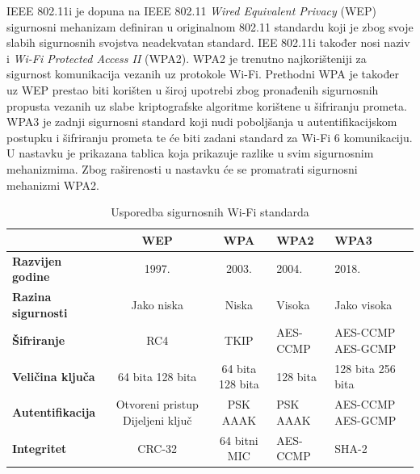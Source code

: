 \documentclass[times, utf8, diplomski]{fer}
\begin{document}
IEEE 802.11i je dopuna na IEEE 802.11 \emph{Wired Equivalent Privacy} (WEP) sigurnosni mehanizam definiran u originalnom 802.11 standardu koji je zbog svoje slabih sigurnosnih svojstva neadekvatan standard. IEE 802.11i također nosi naziv i \emph{Wi-Fi Protected Access II} (WPA2). WPA2 je trenutno najkorišteniji za sigurnost komunikacija vezanih uz protokole Wi-Fi. Prethodni WPA je također uz WEP prestao biti korišten u široj upotrebi zbog pronađenih sigurnosnih propusta vezanih uz slabe kriptografske algoritme korištene u šifriranju prometa. WPA3 je zadnji sigurnosni standard koji nudi poboljšanja u autentifikacijskom postupku i šifriranju prometa te će biti zadani standard za Wi-Fi 6 komunikaciju. U nastavku je prikazana tablica koja prikazuje razlike u svim sigurnosnim mehanizmima. Zbog raširenosti u nastavku će se promatrati sigurnosni mehanizmi WPA2.
\begin{table}[H]
    \centering
    \caption{Usporedba sigurnosnih Wi-Fi standarda}
    \begin{tabular}{| M || S | S | X | X |} 
    \hline
                              & \textbf{WEP} & \textbf{WPA} & \textbf{WPA2} & \textbf{WPA3}\\
    \hline\hline
    \textbf{Razvijen godine}         & 1997. & 2003. & 2004. & 2018.\\
    \hline
    \textbf{Razina sigurnosti}& Jako niska & Niska & Visoka & Jako visoka\\ 
    \hline
    \textbf{{Šifriranje}}     &  RC4 & TKIP & AES-CCMP & AES-CCMP AES-GCMP\\ 
    \hline
    \textbf{Veličina ključa}  & 64 bita \hspace{0.2cm}128 bita & 64 bita\hspace{0.2cm} 128 bita &  128 bita & 128 bita \hspace{1cm}256 bita\\ 
    \hline
    \textbf{Autentifikacija}  & Otvoreni pristup Dijeljeni ključ & PSK AAAK & PSK \hspace{1cm}AAAK & AES-CCMP AES-GCMP\\ 
    \hline
    \textbf{Integritet}       & CRC-32 & 64 bitni MIC & AES-CCMP & SHA-2\\ 
    \hline
    \end{tabular}
    \label{tab:wpa}
\end{table}
\end{document}
